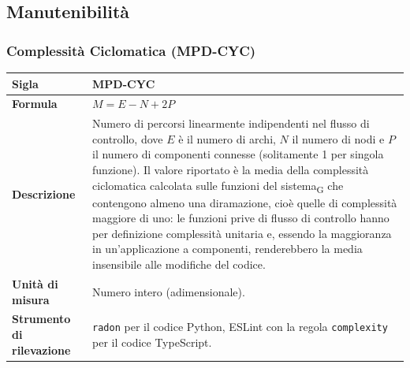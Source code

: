 \documentclass[a4paper, 10pt]{article}
\begin{document}
\vspace{0.8cm}

\subsection{Manutenibilità}

\subsubsection{Complessità Ciclomatica (MPD-CYC)}
\noindent
\begin{minipage}{\textwidth}
    \begin{tabularx}{\textwidth}{|>{\columncolor{bluBitless!10}\bfseries}p{3.5cm}|X|}
        \hline
        Sigla & MPD-CYC \\ \hline
        Formula &
        \textit{$M = E - N + 2P$} \\ \hline
        Descrizione & Numero di percorsi linearmente indipendenti nel flusso di controllo, dove $E$ è il numero di archi, $N$ il numero di nodi e $P$ il numero di componenti connesse (solitamente 1 per singola funzione). Il valore riportato è la media della complessità ciclomatica calcolata sulle funzioni del sistema\textsubscript{G} che contengono almeno una diramazione, cioè quelle di complessità maggiore di uno: le funzioni prive di flusso di controllo hanno per definizione complessità unitaria e, essendo la maggioranza in un'applicazione a componenti, renderebbero la media insensibile alle modifiche del codice. \\ \hline
        Unità di misura & Numero intero (adimensionale). \\ \hline
        Strumento di rilevazione & \texttt{radon} per il codice Python, ESLint con la regola \texttt{complexity} per il codice TypeScript. \\ \hline
    \end{tabularx}
\end{minipage}

\vspace{0.8cm}
\end{document}
